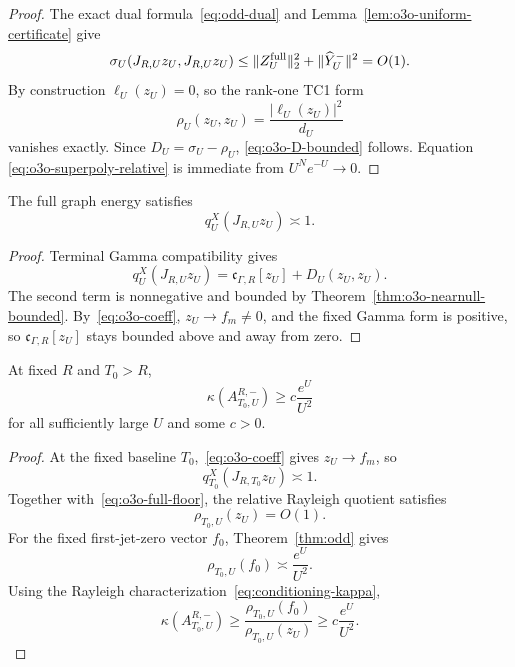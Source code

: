 \begin{proof}
The exact dual formula~\eqref{eq:odd-dual} and
Lemma~\ref{lem:o3o-uniform-certificate} give
\[
 \sigma_U(J_{R,U}z_U,J_{R,U}z_U)
 \le
 \|Z_U^{\rm full}\|_2^2+\|\widehat Y_U^-\|^2
 =O(1).
\]
By construction $\ell_U(z_U)=0$, so the rank-one TC1 form
\[
 \rho_U(z_U,z_U)=\frac{|\ell_U(z_U)|^2}{d_U}
\]
vanishes exactly.  Since $D_U=\sigma_U-\rho_U$,
\eqref{eq:o3o-D-bounded} follows.  Equation
\eqref{eq:o3o-superpoly-relative} is immediate from
$U^Ne^{-U}\to0$.
\end{proof}

\begin{corollary}
\label{cor:o3o-gamma-floor}
The full graph energy satisfies
\[
 \boxed{
 q_U^X(J_{R,U}z_U)\asymp1.
 }
\tag{O3O.8}\label{eq:o3o-full-floor}
\]
\end{corollary}

\begin{proof}
Terminal Gamma compatibility gives
\[
 q_U^X(J_{R,U}z_U)
 =\mathfrak c_{\Gamma,R}[z_U]+D_U(z_U,z_U).
\]
The second term is nonnegative and bounded by
Theorem~\ref{thm:o3o-nearnull-bounded}.  By~\eqref{eq:o3o-coeff},
$z_U\to f_m\ne0$, and the fixed Gamma form is positive, so
$\mathfrak c_{\Gamma,R}[z_U]$ stays bounded above and away from zero.
\end{proof}

\begin{corollary}
\label{cor:o3o-exp-conditioning}
At fixed $R$ and $T_0>R$,
\[
 \boxed{
 \kappa(A_{T_0,U}^{R,-})
 \ge c\frac{e^U}{U^2}
 }
\tag{O3O.9}\label{eq:o3o-exp-conditioning}
\]
for all sufficiently large $U$ and some $c>0$.
\end{corollary}

\begin{proof}
At the fixed baseline $T_0$,~\eqref{eq:o3o-coeff} gives
$z_U\to f_m$, so
\[
 q_{T_0}^X(J_{R,T_0}z_U)\asymp1.
\]
Together with~\eqref{eq:o3o-full-floor}, the relative Rayleigh quotient satisfies
\[
 \rho_{T_0,U}(z_U)=O(1).
\]
For the fixed first-jet-zero vector $f_0$, Theorem~\ref{thm:odd} gives
\[
 \rho_{T_0,U}(f_0)\asymp\frac{e^U}{U^2}.
\]
Using the Rayleigh characterization~\eqref{eq:conditioning-kappa},
\[
 \kappa(A_{T_0,U}^{R,-})
 \ge
 \frac{\rho_{T_0,U}(f_0)}{\rho_{T_0,U}(z_U)}
 \ge c\frac{e^U}{U^2}.
\]
\end{proof}

